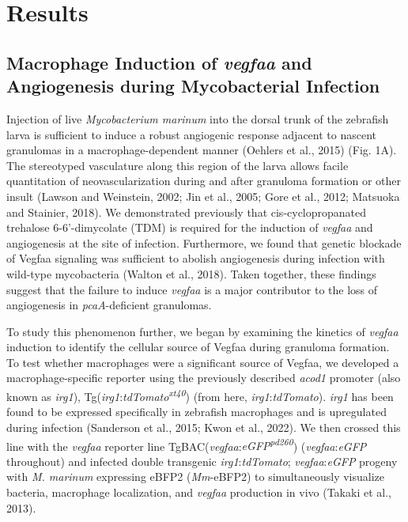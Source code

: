 \section{Results}

\subsection{Macrophage Induction of \textit{vegfaa} and Angiogenesis during Mycobacterial Infection}

Injection of live \textit{Mycobacterium marinum} into the dorsal trunk of the zebrafish larva is sufficient to induce a robust angiogenic response adjacent to nascent granulomas in a macrophage-dependent manner (Oehlers et al., 2015) (Fig. 1A). The stereotyped vasculature along this region of the larva allows facile quantitation of neovascularization during and after granuloma formation or other insult (Lawson and Weinstein, 2002; Jin et al., 2005; Gore et al., 2012; Matsuoka and Stainier, 2018). We demonstrated previously that cis-cyclopropanated trehalose 6-6'-dimycolate (TDM) is required for the induction of \textit{vegfaa} and angiogenesis at the site of infection. Furthermore, we found that genetic blockade of Vegfaa signaling was sufficient to abolish angiogenesis during infection with wild-type mycobacteria (Walton et al., 2018). Taken together, these findings suggest that the failure to induce \textit{vegfaa} is a major contributor to the loss of angiogenesis in \textit{pcaA}-deficient granulomas.

To study this phenomenon further, we began by examining the kinetics of \textit{vegfaa} induction to identify the cellular source of Vegfaa during granuloma formation. To test whether macrophages were a significant source of Vegfaa, we developed a macrophage-specific reporter using the previously described \textit{acod1} promoter (also known as \textit{irg1}), Tg(\textit{irg1}:\textit{tdTomato\textsuperscript{xt40}}) (from here, \textit{irg1}:\textit{tdTomato}). \textit{irg1} has been found to be expressed specifically in zebrafish macrophages and is upregulated during infection (Sanderson et al., 2015; Kwon et al., 2022). We then crossed this line with the \textit{vegfaa} reporter line TgBAC(\textit{vegfaa}:\textit{eGFP\textsuperscript{pd260}}) (\textit{vegfaa}:\textit{eGFP} throughout) and infected double transgenic \textit{irg1}:\textit{tdTomato}; \textit{vegfaa}:\textit{eGFP} progeny with \textit{M. marinum} expressing eBFP2 (\textit{Mm}-eBFP2) to simultaneously visualize bacteria, macrophage localization, and \textit{vegfaa} production in vivo (Takaki et al., 2013).

